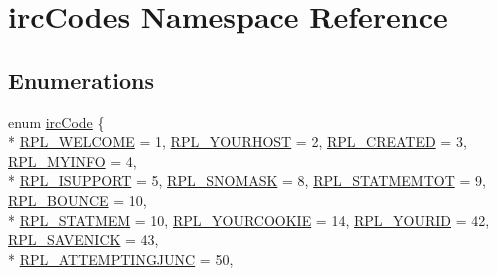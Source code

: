 \hypertarget{namespaceirc_codes}{\section{irc\-Codes Namespace Reference}
\label{d3/d3c/namespaceirc_codes}
}
\subsection*{Enumerations}
\begin{DoxyCompactItemize}
\item 
enum \hyperlink{namespaceirc_codes_a8113647a5ff54d42c1c26e7a0a555286}{irc\-Code} \{ \\*
\hyperlink{namespaceirc_codes_a8113647a5ff54d42c1c26e7a0a555286adc7feeeb3ea2c991306c402a3f356a74}{R\-P\-L\-\_\-\-W\-E\-L\-C\-O\-M\-E} = 1, 
\hyperlink{namespaceirc_codes_a8113647a5ff54d42c1c26e7a0a555286afc8194bdd4c10d7a542b2cc430e37caa}{R\-P\-L\-\_\-\-Y\-O\-U\-R\-H\-O\-S\-T} = 2, 
\hyperlink{namespaceirc_codes_a8113647a5ff54d42c1c26e7a0a555286ad5f859a426886d19accb863b59cbad1e}{R\-P\-L\-\_\-\-C\-R\-E\-A\-T\-E\-D} = 3, 
\hyperlink{namespaceirc_codes_a8113647a5ff54d42c1c26e7a0a555286ada1bb997da47ca8faa9472938702134e}{R\-P\-L\-\_\-\-M\-Y\-I\-N\-F\-O} = 4, 
\\*
\hyperlink{namespaceirc_codes_a8113647a5ff54d42c1c26e7a0a555286a0f1bc0e1593ceac3805428689954a0bf}{R\-P\-L\-\_\-\-I\-S\-U\-P\-P\-O\-R\-T} = 5, 
\hyperlink{namespaceirc_codes_a8113647a5ff54d42c1c26e7a0a555286a523a0665ffb5af11aa4106d5042fbdbb}{R\-P\-L\-\_\-\-S\-N\-O\-M\-A\-S\-K} = 8, 
\hyperlink{namespaceirc_codes_a8113647a5ff54d42c1c26e7a0a555286a2650931594655ab7ba61a8e0c6fcbb76}{R\-P\-L\-\_\-\-S\-T\-A\-T\-M\-E\-M\-T\-O\-T} = 9, 
\hyperlink{namespaceirc_codes_a8113647a5ff54d42c1c26e7a0a555286a81d82296a63022bdaebb41ce103a25ab}{R\-P\-L\-\_\-\-B\-O\-U\-N\-C\-E} = 10, 
\\*
\hyperlink{namespaceirc_codes_a8113647a5ff54d42c1c26e7a0a555286a2eb47bbffc5921eea09c63ae642ef44d}{R\-P\-L\-\_\-\-S\-T\-A\-T\-M\-E\-M} = 10, 
\hyperlink{namespaceirc_codes_a8113647a5ff54d42c1c26e7a0a555286ac0c266c97ef94e0c66983003c633b426}{R\-P\-L\-\_\-\-Y\-O\-U\-R\-C\-O\-O\-K\-I\-E} = 14, 
\hyperlink{namespaceirc_codes_a8113647a5ff54d42c1c26e7a0a555286af4e2f84f5d9a5b1ab0549d67455b641b}{R\-P\-L\-\_\-\-Y\-O\-U\-R\-I\-D} = 42, 
\hyperlink{namespaceirc_codes_a8113647a5ff54d42c1c26e7a0a555286ab37b5bf0e27c86a33cb21bdb13e5d7a8}{R\-P\-L\-\_\-\-S\-A\-V\-E\-N\-I\-C\-K} = 43, 
\\*
\hyperlink{namespaceirc_codes_a8113647a5ff54d42c1c26e7a0a555286a7615675ca97097bde7d9c6b96a365369}{R\-P\-L\-\_\-\-A\-T\-T\-E\-M\-P\-T\-I\-N\-G\-J\-U\-N\-C} = 50, 

\end{DoxyCompactItemize}
